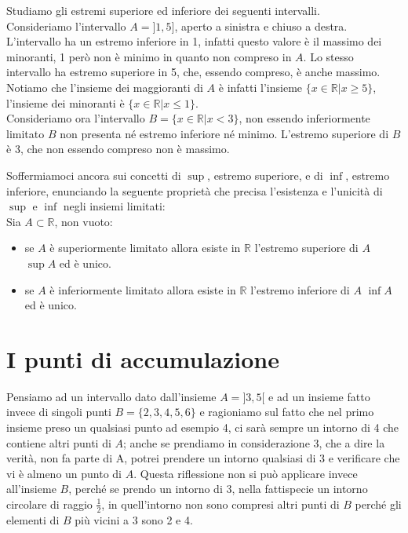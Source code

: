 \begin{esempio}Studiamo gli estremi superiore ed inferiore dei seguenti 
intervalli.\\
Consideriamo l'intervallo \(A=]1, 5]\), aperto a sinistra e chiuso a destra. 
L'intervallo ha un estremo inferiore in 1, infatti questo valore è il massimo 
dei minoranti, 1 però non è minimo in quanto non compreso in \(A\). Lo stesso 
intervallo ha estremo superiore in 5, che, essendo compreso, è anche massimo. 
Notiamo che l'insieme dei maggioranti di \(A\) è infatti l'insieme 
\(\{x\in\mathbb{R}\vert x\geq5\}\), l'insieme dei minoranti è 
\(\{x\in\mathbb{R}\vert x\leq1\}\).\\
Consideriamo ora l'intervallo \(B=\{x\in\mathbb{R}\vert x<3\}\), non essendo 
inferiormente limitato \(B\) non presenta né estremo inferiore né minimo. 
L'estremo superiore di \(B\) è 3, che non essendo compreso non è massimo.\\
\end{esempio}

Soffermiamoci ancora sui concetti di \(\sup\), estremo superiore, e di \(\inf\), 
estremo inferiore, enunciando la seguente proprietà che precisa l'esistenza e 
l'unicità di \(\sup\) e \(\inf\) negli insiemi limitati:\\

Sia \(A\subset\mathbb{R}\), non vuoto:
\begin{itemize}
  \item se \(A\) è superiormente limitato allora esiste in \(\mathbb{R}\) 
l'estremo superiore di \(A\) \(\sup{A}\) ed è unico.
  \item se \(A\) è inferiormente limitato allora esiste in \(\mathbb{R}\) 
l'estremo inferiore di \(A\) \(\inf{A}\) ed è unico.
\end{itemize}

\section{I punti di accumulazione}
Pensiamo ad un intervallo dato dall'insieme \(A=]3, 5[\) e ad un insieme fatto 
invece di singoli punti \(B=\{2,3,4,5,6\}\) e ragioniamo sul fatto che nel 
primo insieme preso un qualsiasi punto ad esempio 4, ci sarà sempre un 
intorno di 4 che contiene altri punti di \(A\); anche se prendiamo in 
considerazione 3, che a dire la verità, non fa parte di A, potrei prendere un 
intorno qualsiasi di 3 e verificare che vi è almeno un punto di \(A\). Questa 
riflessione non si può applicare invece all'insieme \(B\), perché se prendo un 
intorno di 3, nella fattispecie un intorno circolare di raggio \(\frac{1}{2}\), 
in quell'intorno non sono compresi altri punti di \(B\) perché gli elementi di 
\(B\) più vicini a 3 sono 2 e 4.\\


